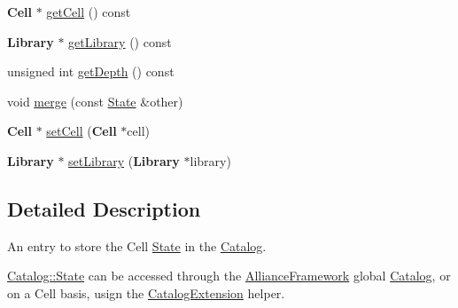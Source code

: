 \begin{DoxyCompactItemize}
\item 
{\bf Cell} $\ast$ \hyperlink{classCRL_1_1Catalog_1_1State_a09c92d08796c465ce5e3a3af56867b8d}{get\-Cell} () const 
\item 
{\bf Library} $\ast$ \hyperlink{classCRL_1_1Catalog_1_1State_a9181d84d102ce74e640e5f3c558191ce}{get\-Library} () const 
\item 
unsigned int \hyperlink{classCRL_1_1Catalog_1_1State_a5b7fbd21f95bdb6ae1cf4b833c9c9729}{get\-Depth} () const 
\item 
void \hyperlink{classCRL_1_1Catalog_1_1State_a41fde67f1b88de06cae113a0d8108f25}{merge} (const \hyperlink{classCRL_1_1Catalog_1_1State}{State} \&other)
\item 
{\bf Cell} $\ast$ \hyperlink{classCRL_1_1Catalog_1_1State_a156714ad3fe2e5bb8ad8549d101526fe}{set\-Cell} ({\bf Cell} $\ast$cell)
\item 
{\bf Library} $\ast$ \hyperlink{classCRL_1_1Catalog_1_1State_a821ac2ae33f0045232cab612ab12f84b}{set\-Library} ({\bf Library} $\ast$library)
\end{DoxyCompactItemize}


\subsection{Detailed Description}
An entry to store the Cell \hyperlink{classCRL_1_1Catalog_1_1State}{State} in the \hyperlink{classCRL_1_1Catalog}{Catalog}. 

\hyperlink{classCRL_1_1Catalog_1_1State}{Catalog\-::\-State} can be accessed through the \hyperlink{classCRL_1_1AllianceFramework}{Alliance\-Framework} global \hyperlink{classCRL_1_1Catalog}{Catalog}, or on a Cell basis, usign the \hyperlink{classCRL_1_1CatalogExtension}{Catalog\-Extension} helper. 

